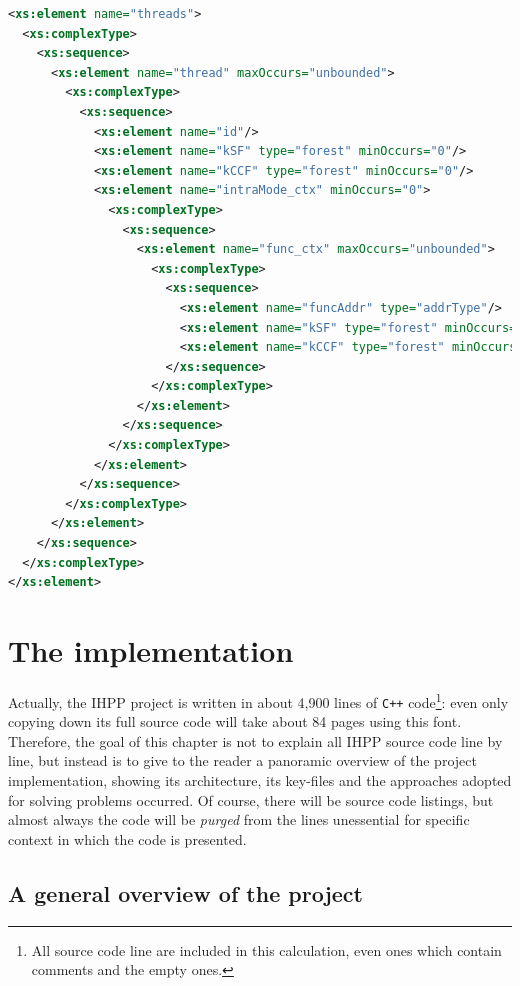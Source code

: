 \documentclass[a4paper,10pt]{report}
\begin{document}
\begin{lstlisting}[language=XML, frame=leftline, 
caption={an extract from \texttt{outputschema.xsd}}, label={xsd},
morekeywords={encoding, xs:schema,xs:element,
xs:complexType,xs:sequence,xs:attribute}]
<xs:element name="threads">
  <xs:complexType>
    <xs:sequence>
      <xs:element name="thread" maxOccurs="unbounded">
        <xs:complexType>
          <xs:sequence>
            <xs:element name="id"/>
            <xs:element name="kSF" type="forest" minOccurs="0"/>
            <xs:element name="kCCF" type="forest" minOccurs="0"/>
            <xs:element name="intraMode_ctx" minOccurs="0">
              <xs:complexType>
                <xs:sequence>
                  <xs:element name="func_ctx" maxOccurs="unbounded">
                    <xs:complexType>
                      <xs:sequence>
                        <xs:element name="funcAddr" type="addrType"/>
                        <xs:element name="kSF" type="forest" minOccurs="0"/>
                        <xs:element name="kCCF" type="forest" minOccurs="0"/>
                      </xs:sequence>
                    </xs:complexType>
                  </xs:element>
                </xs:sequence>
              </xs:complexType>
            </xs:element>
          </xs:sequence>
        </xs:complexType>
      </xs:element>
    </xs:sequence>
  </xs:complexType>
</xs:element>
\end{lstlisting}


\chapter{The implementation}

Actually, the IHPP project is written in about 4,900 lines of \verb|C++| 
code\footnote{All source code line are included in this calculation, even ones which 
contain comments and the empty ones.}: 
even only copying down its full source code will take about 84 pages using
this font. Therefore, the goal of this chapter is not to explain 
all IHPP source code line by line, but instead is to give to the reader 
a panoramic overview of the project implementation, showing its architecture, 
its key-files and the approaches adopted for solving problems occurred.
Of course, there will be source code listings, but almost always the code will be
\emph{purged} from the lines unessential for specific context in which the code is presented.

\section{A general overview of the project}
\end{document}

